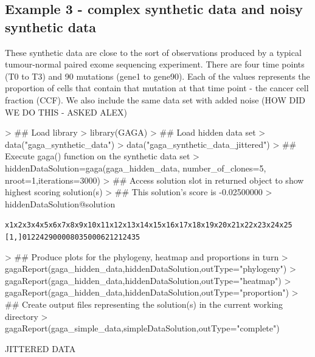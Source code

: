 \documentclass{article}
\begin{document}
\subsection{Example 3 - complex synthetic data and noisy synthetic data}
These synthetic data are close to the sort of observations produced by a typical tumour-normal paired exome sequencing experiment.  There are four time points (T0 to T3) and 90 mutations (gene1 to gene90).  Each of the values represents the proportion of cells that contain that mutation at that time point - the cancer cell fraction (CCF).  {\color{red}We also include the same data set with added noise (HOW DID WE DO THIS - ASKED ALEX)}


\begin{Schunk}
\begin{Sinput}
> ## Load library
> library(GAGA)
> ## Load hidden data set
> data("gaga_synthetic_data")
> data("gaga_synthetic_data_jittered")
> ## Execute gaga() function on the synthetic data set
> hiddenDataSolution=gaga(gaga_hidden_data, number_of_clones=5, nroot=1,iterations=3000)
> ## Access solution slot in returned object to show highest scoring solution(s)
> ## This solution's score is -0.02500000
> hiddenDataSolution@solution
\end{Sinput}
\end{Schunk}
\begin{alltt}
     x1 x2 x3 x4 x5 x6 x7 x8 x9 x10 x11 x12 x13 x14 x15 x16 x17 x18 x19 x20 x21 x22 x23 x24 x25
[1,]  0  1  2  2  4 29  0  0  0   0   8   0   3   5   0   0   0   6   2  12   1   2   4   3   5
\end{alltt}

\begin{Schunk}
\begin{Sinput}
> ## Produce plots for the phylogeny, heatmap and proportions in turn
> gagaReport(gaga_hidden_data,hiddenDataSolution,outType="phylogeny")
> gagaReport(gaga_hidden_data,hiddenDataSolution,outType="heatmap")
> gagaReport(gaga_hidden_data,hiddenDataSolution,outType="proportion")
> ## Create output files representing the solution(s) in the current working directory
> gagaReport(gaga_simple_data,simpleDataSolution,outType="complete")
\end{Sinput}
\end{Schunk}



JITTERED DATA
\end{document}
